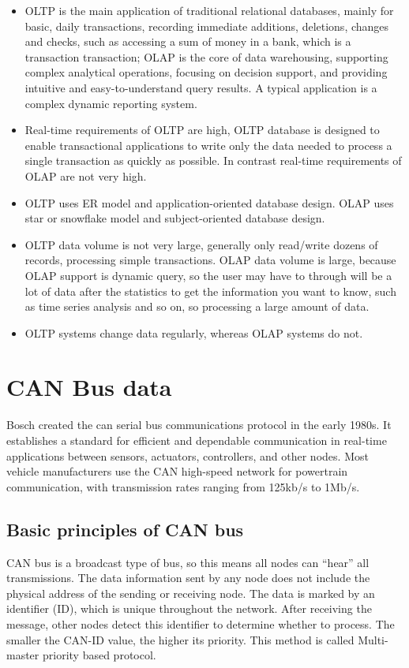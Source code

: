 \begin{itemize}
    \item OLTP is the main application of traditional relational databases, mainly for basic, daily transactions, recording immediate additions, deletions, changes and checks, such as accessing a sum of money in a bank, which is a transaction transaction; OLAP is the core of data warehousing, supporting complex analytical operations, focusing on decision support, and providing intuitive and easy-to-understand query results. A typical application is a complex dynamic reporting system.
    
    \item Real-time requirements of OLTP  are high, OLTP database is designed to enable transactional applications to write only the data needed to process a single transaction as quickly as possible. In contrast real-time requirements of OLAP are not very high.
    
    \item OLTP uses ER model and application-oriented database design. OLAP uses star or snowflake model and subject-oriented database design\cite{ibm_oltp}.
    
    \item OLTP data volume is not very large, generally only read/write dozens of records, processing simple transactions. OLAP data volume is large, because OLAP support is dynamic query, so the user may have to through will be a lot of data after the statistics to get the information you want to know, such as time series analysis and so on, so processing a large amount of data\cite{ibm_oltp}.

    \item OLTP systems change data regularly, whereas OLAP systems do not.
\end{itemize}

\section{CAN Bus data}
Bosch created the \ac{can} serial bus communications protocol in the early 1980s. It establishes a standard for efficient and dependable communication in real-time applications between sensors, actuators, controllers, and other nodes\cite{4677544}. Most vehicle manufacturers use the CAN high-speed network for powertrain communication, with transmission rates ranging from 125kb/s to 1Mb/s. 

\subsection{Basic principles of CAN bus}
CAN bus is a broadcast type of bus, so this means all nodes can “hear” all transmissions\cite{can_protocol}. The data information sent by any node does not include the physical address of the sending or receiving node. The data is marked by an identifier (ID), which is unique throughout the network. After receiving the message, other nodes detect this identifier to determine whether to process. The smaller the CAN-ID value, the higher its priority. This method is called Multi-master priority based protocol. 


